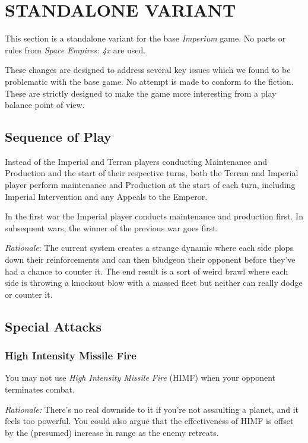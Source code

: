 \section{STANDALONE VARIANT}
\hfill

This section is a standalone variant for the base \textit{Imperium} game. No parts or rules from \textit{Space Empires: 4x} are used.

These changes are designed to address several key issues which we found to be problematic with the base game. No attempt is made to conform to the fiction. These are strictly designed to make the game more interesting from a play balance point of view.

\subsection{Sequence of Play}

Instead of the Imperial and Terran players conducting Maintenance and Production and the start of their respective turns, both the Terran and Imperial player perform maintenance and Production at the start of each turn, including Imperial Intervention and any Appeals to the Emperor.

In the first war the Imperial player conducts maintenance and production first. In subsequent wars, the winner of the previous war goes first.

\textit{Rationale}: The current system creates a strange dynamic where each side plops down their reinforcements and can then bludgeon their opponent before they've had a chance to counter it. The end result is a sort of weird brawl where each side is throwing a knockout blow with a massed fleet but neither can really dodge or counter it.

\subsection{Special Attacks}

\subsubsection{High Intensity Missile Fire}

You may not use \textit{High Intensity Missile Fire} (HIMF) when your opponent terminates combat.

\textit{Rationale:} There's no real downside to it if you're not assaulting a planet, and it feels too powerful. You could also argue that the effectiveness of HIMF is offset by the (presumed) increase in range as the enemy retreats.

